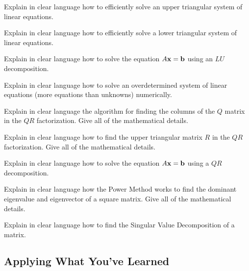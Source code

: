 \begin{problem}
    Explain in clear language how to efficiently solve an upper triangular system of
    linear equations.
\end{problem}

\begin{problem}
    Explain in clear language how to efficiently solve a lower triangular system of
    linear equations.
\end{problem}

\begin{problem}
    Explain in clear language how to solve the equation $A {\bf x} = {\bf b}$ using an $LU$
    decomposition.  
\end{problem}

\begin{problem}
    Explain in clear language how to solve an overdetermined system of linear equations (more
    equations than unknowns) numerically.
\end{problem}

\begin{problem}
    Explain in clear language the algorithm for finding the columns of the $Q$ matrix in
    the $QR$ factorization.  Give all of the mathematical details.
\end{problem}

\begin{problem}
    Explain in clear language how to find the upper triangular matrix $R$ in the $QR$
    factorization.  Give all of the mathematical details.
\end{problem}

\begin{problem}
    Explain in clear language how to solve the equation $A {\bf x} = {\bf b}$ using a $QR$
    decomposition.
\end{problem}

\begin{problem}
    Explain in clear language how the Power Method works to find the dominant eigenvalue
    and eigenvector of a square matrix.  Give all of the mathematical details.
\end{problem}

\begin{problem}
    Explain in clear language how to find the Singular Value Decomposition of a matrix.
\end{problem}

\subsection{Applying What You've Learned}


